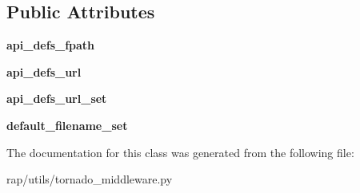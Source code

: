 \subsection*{Public Attributes}
\begin{DoxyCompactItemize}
\item 
\mbox{\label{classrap_1_1utils_1_1tornado__middleware_1_1SwaggerUIHandler_a53750254b72b3d45e90d6a0921ad438c}} 
{\bfseries api\+\_\+defs\+\_\+fpath}
\item 
\mbox{\label{classrap_1_1utils_1_1tornado__middleware_1_1SwaggerUIHandler_ae23d5e81e5750fb51a5fb18d5baae35d}} 
{\bfseries api\+\_\+defs\+\_\+url}
\item 
\mbox{\label{classrap_1_1utils_1_1tornado__middleware_1_1SwaggerUIHandler_a3f7cca2bcd79453ae6c7899be6f41cdb}} 
{\bfseries api\+\_\+defs\+\_\+url\+\_\+set}
\item 
\mbox{\label{classrap_1_1utils_1_1tornado__middleware_1_1SwaggerUIHandler_a44071ef947e8eac3907f2347fc80b436}} 
{\bfseries default\+\_\+filename\+\_\+set}
\end{DoxyCompactItemize}


The documentation for this class was generated from the following file\+:\begin{DoxyCompactItemize}
\item 
rap/utils/tornado\+\_\+middleware.\+py\end{DoxyCompactItemize}
